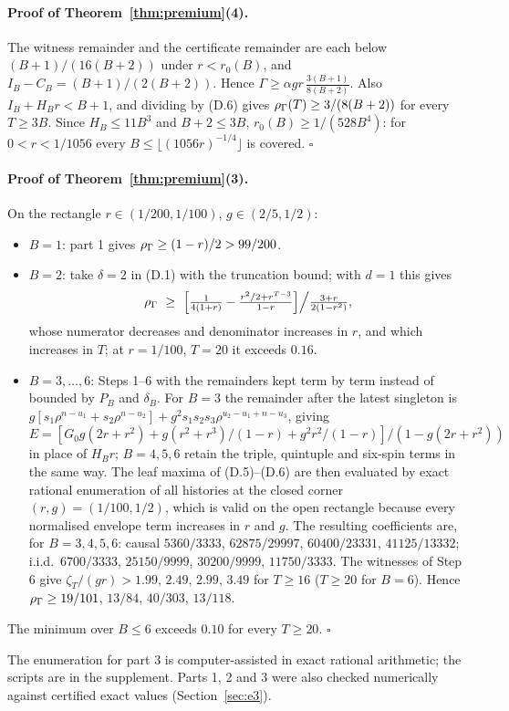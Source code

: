 \paragraph{Proof of Theorem~\ref{thm:premium}(4).} The witness remainder and the certificate remainder are each below $(B+1)/(16(B+2))$ under $r<r_0(B)$, and $I_B-C_B=(B+1)/(2(B+2))$. Hence $\Gamma\ge\alpha gr\,\frac{3(B+1)}{8(B+2)}$. Also $I_B+H_Br<B+1$, and dividing by (D.6) gives $\rho_\Gamma(T)\ge3/(8(B+2))$ for every $T\ge3B$. Since $H_B\le11B^3$ and $B+2\le3B$, $r_0(B)\ge1/(528B^4)$: for $0<r<1/1056$ every $B\le\lfloor(1056r)^{-1/4}\rfloor$ is covered. \hfill$\square$

\paragraph{Proof of Theorem~\ref{thm:premium}(3).} On the rectangle $r\in(1/200,1/100)$, $g\in(2/5,1/2)$:
\begin{itemize}
\item $B=1$: part 1 gives $\rho_\Gamma\ge(1-r)/2>99/200$.
\item $B=2$: take $\delta=2$ in (D.1) with the truncation bound; with $d=1$ this gives
\[
\rhoG\ \ge\ \Big[\tfrac1{4(1+r)}-\tfrac{r^2/2+r^{T-3}}{1-r}\Big]\Big/\tfrac{3+r}{2(1-r^2)},
\]
whose numerator decreases and denominator increases in $r$, and which increases in $T$; at $r=1/100$, $T=20$ it exceeds $0.16$.
\item $B=3,\dots,6$: Steps 1--6 with the remainders kept term by term instead of bounded by $P_B$ and $\delta_B$. For $B=3$ the remainder after the latest singleton is $g[s_1\rho^{n-u_1}+s_2\rho^{n-u_2}]+g^2s_1s_2s_3\rho^{u_2-u_1+n-u_3}$, giving $E=[G_0g(2r+r^2)+g(r^2+r^3)/(1-r)+g^2r^2/(1-r)]/(1-g(2r+r^2))$ in place of $H_Br$; $B=4,5,6$ retain the triple, quintuple and six-spin terms in the same way. The leaf maxima of (D.5)--(D.6) are then evaluated by exact rational enumeration of all histories at the closed corner $(r,g)=(1/100,1/2)$, which is valid on the open rectangle because every normalised envelope term increases in $r$ and $g$. The resulting coefficients are, for $B=3,4,5,6$: causal $5360/3333$, $62875/29997$, $60400/23331$, $41125/13332$; i.i.d.\ $6700/3333$, $25150/9999$, $30200/9999$, $11750/3333$. The witnesses of Step 6 give $\zeta_T/(gr)>1.99,\,2.49,\,2.99,\,3.49$ for $T\ge16$ ($T\ge20$ for $B=6$). Hence $\rho_\Gamma\ge19/101$, $13/84$, $40/303$, $13/118$.
\end{itemize}
The minimum over $B\le6$ exceeds $0.10$ for every $T\ge20$. \hfill$\square$

The enumeration for part 3 is computer-assisted in exact rational arithmetic; the scripts are in the supplement. Parts 1, 2 and 3 were also checked numerically against certified exact values (Section~\ref{sec:e3}).
